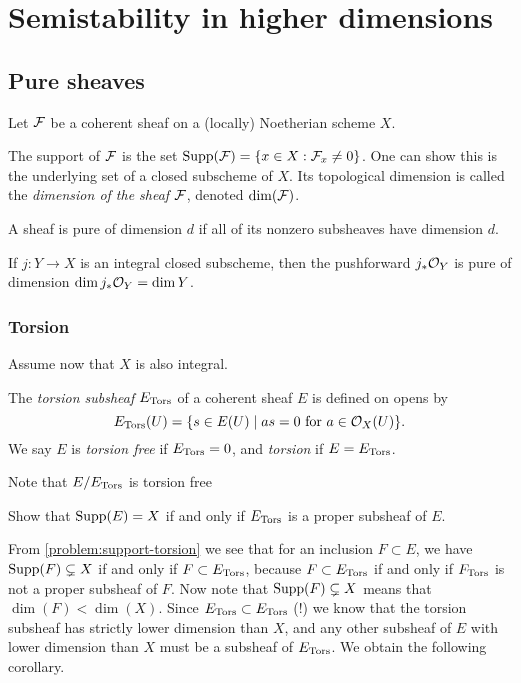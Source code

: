 \chapter{Semistability in higher dimensions}

\section{Pure sheaves}

Let $\mathcal{F}$ be a coherent sheaf on a (locally) Noetherian scheme $X$. 

\begin{definition}
	The support of $\mathcal{F}$ is the set $\operatorname{Supp}(\mathcal{F}) = \{x \in X: \mathcal{F}_x \neq 0\}$.
	One can show this is the underlying set of a closed subscheme of $X$. Its topological dimension is called the \emph{dimension of the sheaf} $\mathcal{F}$, denoted $\dim(\mathcal{F})$.
\end{definition}

\begin{definition}
	A sheaf is pure of dimension $d$ if all of its nonzero subsheaves have dimension $d$. 
\end{definition}

\begin{problem}
	If $j: Y \to X$ is an integral closed subscheme, then the pushforward $j_* \mathcal{O}_Y$ is pure of dimension $\dim j_*\mathcal{O}_Y = \dim Y$. 
\end{problem}

\subsection{Torsion}
Assume now that $X$ is also integral. 

\begin{definition}
	The \emph{torsion subsheaf} $E_{\operatorname{Tors}}$ 
	of a coherent sheaf $E$ is defined on opens by \[E_{\operatorname{Tors}}(U) = \{s \in E(U) \mid as = 0 \text{ for } a \in \mathcal{O}_X(U)\}.\] We say $E$ is \emph{torsion free} if $E_{\operatorname{Tors}} = 0$, and \emph{torsion} if $E = E_{\operatorname{Tors}}$. 
\end{definition}
Note that $E/E_{\operatorname{Tors}}$ is torsion free  

\begin{problem}\label{problem:support-torsion}
	Show that $\operatorname{Supp}(E) = X$ if and only if $E_{\operatorname{Tors}}$ is a proper subsheaf of $E$. 
\end{problem}

From \cref{problem:support-torsion} we see that for an inclusion $F \subset E$, we have $\operatorname{Supp}(F) \subsetneq X$ if and only if $F \subset E_{\operatorname{Tors}}$, because $F \subset E_{\operatorname{Tors}}$ if and only if $F_{\operatorname{Tors}}$ is not a proper subsheaf of $F$. Now note that $\operatorname{Supp}(F) \subsetneq X$ means that $\dim(F) < \dim(X)$. Since $E_{\operatorname{Tors}} \subset E_{\operatorname{Tors}}$ (!) we know that the torsion subsheaf has strictly lower dimension than $X$, and any other subsheaf of $E$ with lower dimension than $X$ must be a subsheaf of $E_{\operatorname{Tors}}$. We obtain the following corollary. 


